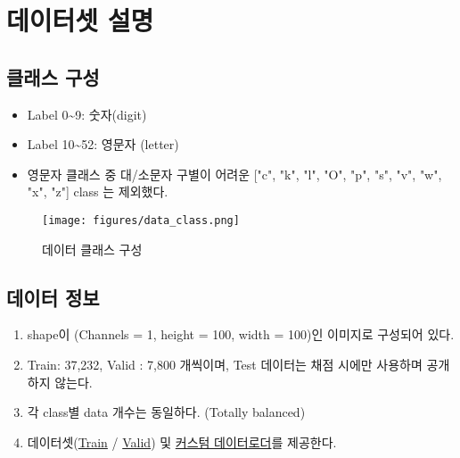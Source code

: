 \section{데이터셋 설명}{\label{sec:dataset}}

\subsection{클래스 구성}
\begin{itemize}\tightlist
    \item Label 0\textasciitilde 9: 숫자(digit)
    \item Label 10\textasciitilde 52: 영문자 (letter)
    \item 영문자 클래스 중 대/소문자 구별이 어려운 ["c", "k", "l", "O", "p", "s", "v", "w", "x", "z"] class 는 제외했다.
\end{itemize}

\begin{figure}[htp]
    \centering
    \texttt{[image: figures/data\_class.png]}
    \caption{데이터 클래스 구성}
    \label{fig:data_class}
\end{figure}

\subsection{데이터 정보}
    \begin{enumerate}[(1)]\tightlist
        \item shape이 (Channels = 1, height = 100, width = 100)인 이미지로 구성되어 있다.
        \item Train: 37,232, Valid : 7,800 개씩이며, Test 데이터는 채점 시에만 사용하며 공개하지 않는다.
        \item 각 class별 data 개수는 동일하다. (Totally balanced) 
        \item 데이터셋(\href{https://drive.google.com/file/d/1-0m3td18RdXxhuZy0bC_cypoekqadGCF/view?usp=share_link}{Train} / 
        \href{https://drive.google.com/file/d/1-1ZeyExAgyakkECohzJK5tofmG5SDgNa/view?usp=share_link}{Valid}) 및
        \href{https://github.com/jaehyun-ko/EEE4178-Project-2022/blob/main/src/Project_2022_utils.ipynb}{커스텀 데이터로더}를 제공한다.
    \end{enumerate}

